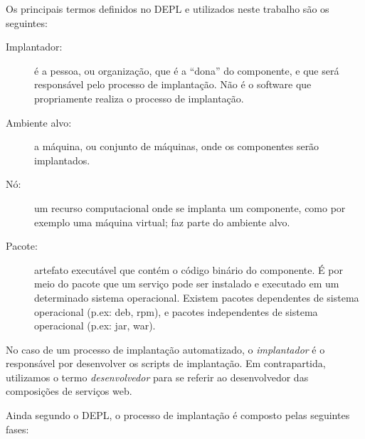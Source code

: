
Os principais termos definidos no DEPL e utilizados neste trabalho são os seguintes:

\begin{description}
\item [Implantador:] é a pessoa, ou organização, que é a ``dona'' do componente, e que será responsável pelo processo de implantação. Não é o software que propriamente realiza o processo de implantação.
\item [Ambiente alvo:] a máquina, ou conjunto de máquinas, onde os componentes serão implantados.
\item [Nó:] um recurso computacional onde se implanta um componente, 
como por exemplo uma máquina virtual; faz parte do ambiente alvo.
\item [Pacote:] artefato executável que contém o código binário do componente.
É por meio do pacote que um serviço pode ser instalado e executado em um determinado
sistema operacional. Existem pacotes dependentes de sistema operacional (p.ex: deb, rpm),
e pacotes independentes de sistema operacional (p.ex: jar, war).
\end{description}

No caso de um processo de implantação automatizado, o \emph{implantador}
é o responsável por desenvolver os scripts de implantação.
Em contrapartida, utilizamos o termo \emph{desenvolvedor} para se referir ao
desenvolvedor das composições de serviços web.

Ainda segundo o DEPL, o processo de implantação é composto pelas seguintes fases:

